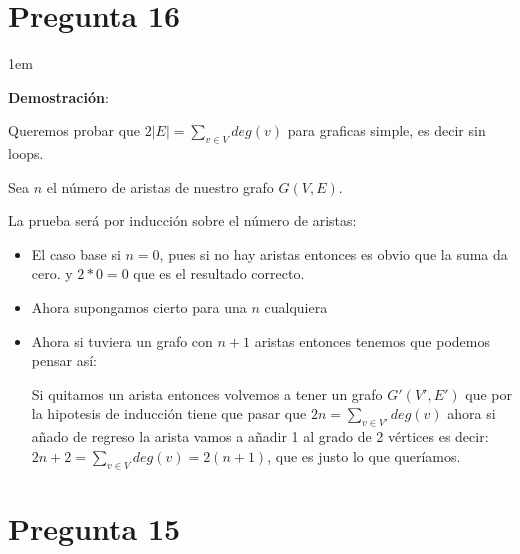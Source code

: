 \documentclass[12pt, fleqn]{article}                            %
\newenvironment{SmallIndentation}[1][0.75em]                    %
        {\begin{adjustwidth}{#1}{}\begin{footnotesize}}             %
        {\end{footnotesize}\end{adjustwidth}}                       %
\theoremstyle{break}                                            %
\begin{document}
    \section{Pregunta 16}

        \begin{SmallIndentation}[1em]
            \textbf{Demostración}:


            Queremos probar que $2 |E| = \sum_{v \in V} deg(v)$ para graficas simple, es decir sin loops.

            Sea $n$ el número de aristas de nuestro grafo $G(V, E)$.

            La prueba será por inducción sobre el número de aristas:
            \begin{itemize}
                \item El caso base si $n = 0$, pues si no hay aristas entonces es obvio que la suma da cero.
                    y $2 * 0 = 0$ que es el resultado correcto.

                \item Ahora supongamos cierto para una $n$ cualquiera
                
                \item Ahora si tuviera un grafo con $n+1$ aristas entonces tenemos que podemos pensar así:
                
                Si quitamos un arista entonces volvemos a tener un grafo $G'(V', E')$ que por la hipotesis de inducción
                tiene que pasar que $2n = \sum_{v \in V'} deg(v)$ ahora si añado de regreso la arista vamos a añadir
                1 al grado de 2 vértices es decir: 
                $2n + 2 = \sum_{v \in V} deg(v) = 2(n+1)$, que es justo lo que queríamos.
            \end{itemize}
        
        \end{SmallIndentation}



    \clearpage
    \section{Pregunta 15}
\end{document}
